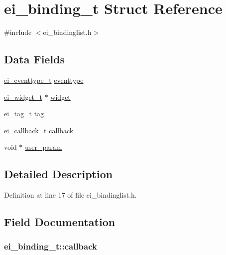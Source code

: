 \hypertarget{structei__binding__t}{\section{ei\-\_\-binding\-\_\-t Struct Reference}
\label{structei__binding__t}
}


{\ttfamily \#include $<$ei\-\_\-bindinglist.\-h$>$}

\subsection*{Data Fields}
\begin{DoxyCompactItemize}
\item 
\hyperlink{ei__event_8h_a132dde064150d861ad24e9d839cbe007}{ei\-\_\-eventtype\-\_\-t} \hyperlink{structei__binding__t_ab27c15aa1ee61c51f132d0541bd8705a}{eventtype}
\item 
\hyperlink{structei__widget__t}{ei\-\_\-widget\-\_\-t} $\ast$ \hyperlink{structei__binding__t_ad3718306b2208e40f52e1da324040588}{widget}
\item 
\hyperlink{ei__event_8h_a24a8242260cfd8ddb6ef915f3de5a10f}{ei\-\_\-tag\-\_\-t} \hyperlink{structei__binding__t_acb3317b30d1a82f70ba51bb767aded9f}{tag}
\item 
\hyperlink{ei__widget_8h_a3692fee0affca071917f22f2ec2018a4}{ei\-\_\-callback\-\_\-t} \hyperlink{structei__binding__t_aa31674f278691576ecc30a76d82bbeab}{callback}
\item 
void $\ast$ \hyperlink{structei__binding__t_a0f76dee050fdb325e77e2aad1b57b803}{user\-\_\-param}
\end{DoxyCompactItemize}


\subsection{Detailed Description}


Definition at line 17 of file ei\-\_\-bindinglist.\-h.



\subsection{Field Documentation}
\hypertarget{structei__binding__t_aa31674f278691576ecc30a76d82bbeab}{
\subsubsection[{callback}]{ ei\-\_\-binding\-\_\-t\-::callback}}\label{structei__binding__t_aa31674f278691576ecc30a76d82bbeab}


